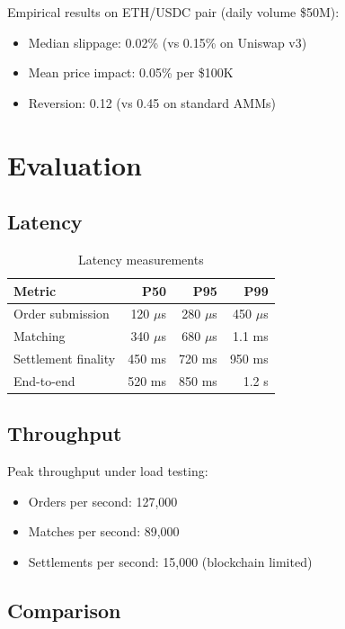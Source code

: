 \documentclass[11pt,a4paper]{article}
\begin{document}
Empirical results on ETH/USDC pair (daily volume \$50M):

\begin{itemize}
    \item Median slippage: 0.02\% (vs 0.15\% on Uniswap v3)
    \item Mean price impact: 0.05\% per \$100K
    \item Reversion: 0.12 (vs 0.45 on standard AMMs)
\end{itemize}

\section{Evaluation}

\subsection{Latency}

\begin{table}[h]
\centering
\begin{tabular}{lrrr}
\toprule
\textbf{Metric} & \textbf{P50} & \textbf{P95} & \textbf{P99} \\
\midrule
Order submission & 120 $\mu$s & 280 $\mu$s & 450 $\mu$s \\
Matching & 340 $\mu$s & 680 $\mu$s & 1.1 ms \\
Settlement finality & 450 ms & 720 ms & 950 ms \\
End-to-end & 520 ms & 850 ms & 1.2 s \\
\bottomrule
\end{tabular}
\caption{Latency measurements}
\end{table}

\subsection{Throughput}

Peak throughput under load testing:

\begin{itemize}
    \item Orders per second: 127,000
    \item Matches per second: 89,000
    \item Settlements per second: 15,000 (blockchain limited)
\end{itemize}

\subsection{Comparison}
\end{document}
